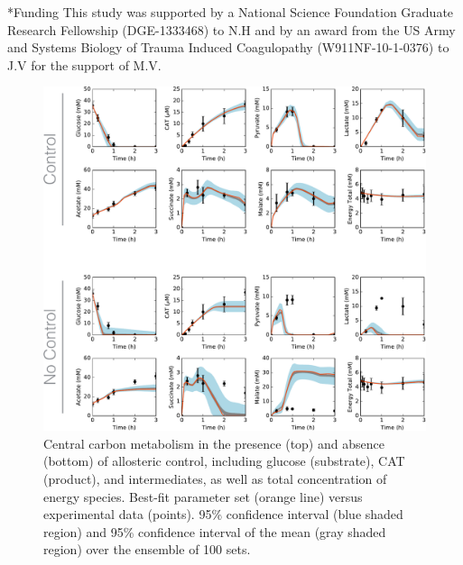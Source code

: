 \documentclass[12pt]{article}
\makeatletter
\renewcommand\section{\@startsection
	{subsection}{2}{0mm}
	{-0.2in}
	{0.05\baselineskip}
	{\normalfont\large\bfseries}}
\makeatother
\begin{document}
\section*{Funding}
This study was supported by a National Science Foundation Graduate Research Fellowship (DGE-1333468) to N.H and by an award from the US Army and Systems Biology of Trauma Induced Coagulopathy (W911NF-10-1-0376) to J.V for the support of M.V.

\clearpage



\clearpage


\begin{figure}[ht]
\centering
\includegraphics[width=1.00\textwidth]{./Figures/allostericControl_noindex.pdf}
\caption{Central carbon metabolism in the presence (top) and absence (bottom) of allosteric control, including glucose (substrate), CAT (product), and intermediates, as well as total concentration of energy species. Best-fit parameter set (orange line) versus experimental data (points). 95\% confidence interval (blue shaded region) and 95\% confidence interval of the mean (gray shaded region) over the ensemble of 100 sets.}
\label{fig:CarbonBoth}
\end{figure}
\end{document}
